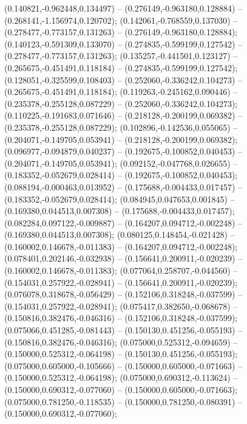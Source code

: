 (0.140821,-0.962448,0.134497) -- (0.276149,-0.963180,0.128884) -- (0.268141,-1.156974,0.120702);
 (0.142061,-0.768559,0.137030) -- (0.278477,-0.773157,0.131263) -- (0.276149,-0.963180,0.128884);
 (0.140123,-0.591309,0.133070) -- (0.274835,-0.599199,0.127542) -- (0.278477,-0.773157,0.131263);
 (0.135257,-0.441501,0.123127) -- (0.265675,-0.451491,0.118184) -- (0.274835,-0.599199,0.127542);
 (0.128051,-0.325599,0.108403) -- (0.252060,-0.336242,0.104273) -- (0.265675,-0.451491,0.118184);
 (0.119263,-0.245162,0.090446) -- (0.235378,-0.255128,0.087229) -- (0.252060,-0.336242,0.104273);
 (0.110225,-0.191683,0.071646) -- (0.218128,-0.200199,0.069382) -- (0.235378,-0.255128,0.087229);
 (0.102896,-0.142536,0.055065) -- (0.204071,-0.149705,0.053941) -- (0.218128,-0.200199,0.069382);
 (0.096977,-0.094879,0.040237) -- (0.192675,-0.100852,0.040453) -- (0.204071,-0.149705,0.053941);
 (0.092152,-0.047768,0.026655) -- (0.183352,-0.052679,0.028414) -- (0.192675,-0.100852,0.040453);
 (0.088194,-0.000463,0.013952) -- (0.175688,-0.004433,0.017457) -- (0.183352,-0.052679,0.028414);
 (0.084945,0.047653,0.001845) -- (0.169380,0.044513,0.007308) -- (0.175688,-0.004433,0.017457);
 (0.082284,0.097122,-0.009887) -- (0.164207,0.094712,-0.002248) -- (0.169380,0.044513,0.007308);
 (0.080125,0.148454,-0.021428) -- (0.160002,0.146678,-0.011383) -- (0.164207,0.094712,-0.002248);
 (0.078401,0.202146,-0.032938) -- (0.156641,0.200911,-0.020239) -- (0.160002,0.146678,-0.011383);
 (0.077064,0.258707,-0.044560) -- (0.154031,0.257922,-0.028941) -- (0.156641,0.200911,-0.020239);
 (0.076078,0.318678,-0.056429) -- (0.152106,0.318248,-0.037599) -- (0.154031,0.257922,-0.028941);
 (0.075417,0.382650,-0.068678) -- (0.150816,0.382476,-0.046316) -- (0.152106,0.318248,-0.037599);
 (0.075066,0.451285,-0.081443) -- (0.150130,0.451256,-0.055193) -- (0.150816,0.382476,-0.046316);
 (0.075000,0.525312,-0.094659) -- (0.150000,0.525312,-0.064198) -- (0.150130,0.451256,-0.055193);
 (0.075000,0.605000,-0.105666) -- (0.150000,0.605000,-0.071663) -- (0.150000,0.525312,-0.064198);
 (0.075000,0.690312,-0.113624) -- (0.150000,0.690312,-0.077060) -- (0.150000,0.605000,-0.071663);
 (0.075000,0.781250,-0.118535) -- (0.150000,0.781250,-0.080391) -- (0.150000,0.690312,-0.077060);
